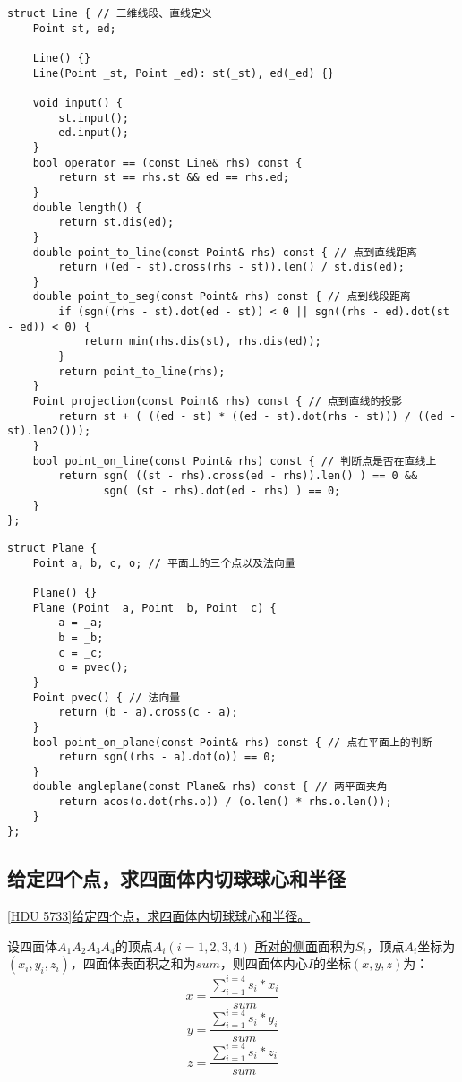 \begin{lstlisting}
struct Line { // 三维线段、直线定义
	Point st, ed;

	Line() {}
	Line(Point _st, Point _ed): st(_st), ed(_ed) {}
	
	void input() {
		st.input();
		ed.input();
	}
	bool operator == (const Line& rhs) const {
		return st == rhs.st && ed == rhs.ed;
	}
	double length() {
		return st.dis(ed);
	}
	double point_to_line(const Point& rhs) const { // 点到直线距离
		return ((ed - st).cross(rhs - st)).len() / st.dis(ed);
	}
	double point_to_seg(const Point& rhs) const { // 点到线段距离
		if (sgn((rhs - st).dot(ed - st)) < 0 || sgn((rhs - ed).dot(st - ed)) < 0) {
			return min(rhs.dis(st), rhs.dis(ed));
		}
		return point_to_line(rhs);
	}
	Point projection(const Point& rhs) const { // 点到直线的投影
 		return st + ( ((ed - st) * ((ed - st).dot(rhs - st))) / ((ed - st).len2()));
	}
	bool point_on_line(const Point& rhs) const { // 判断点是否在直线上
		return sgn( ((st - rhs).cross(ed - rhs)).len() ) == 0 &&
			   sgn( (st - rhs).dot(ed - rhs) ) == 0;
	}
};
\end{lstlisting}

\begin{lstlisting}
struct Plane {
	Point a, b, c, o; // 平面上的三个点以及法向量

	Plane() {}
	Plane (Point _a, Point _b, Point _c) {
		a = _a;
		b = _b;
		c = _c;
		o = pvec();
	}
	Point pvec() { // 法向量
		return (b - a).cross(c - a);
	}
	bool point_on_plane(const Point& rhs) const { // 点在平面上的判断
		return sgn((rhs - a).dot(o)) == 0;
	}
	double angleplane(const Plane& rhs) const { // 两平面夹角
		return acos(o.dot(rhs.o)) / (o.len() * rhs.o.len());
	}
};
\end{lstlisting}

\subsection{给定四个点，求四面体内切球球心和半径}

\underline{[HDU 5733]给定四个点，求四面体内切球球心和半径。}

设四面体$A_{1}A_{2}A_{3}A_{4}$的顶点$A_{i}(i=1,2,3,4)$ \underline{所对的侧面}面积为$S_{i}$，顶点$A_{i}$坐标为$(x_{i},y_{i},z_{i})$，四面体表面积之和为$sum$，则四面体内心$I$的坐标$(x,y,z)$为：
$$x=\frac{\sum_{i=1}^{i=4}{s_{i}*x_{i}}}{sum}$$
$$y=\frac{\sum_{i=1}^{i=4}{s_{i}*y_{i}}}{sum}$$
$$z=\frac{\sum_{i=1}^{i=4}{s_{i}*z_{i}}}{sum}$$

